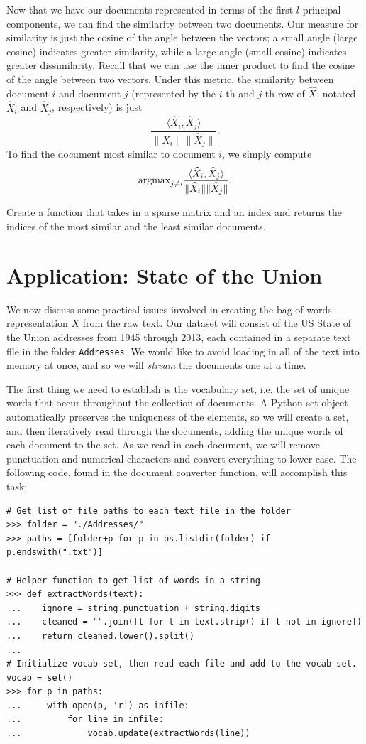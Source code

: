 Now that we have our documents represented in terms of the first $l$ principal components, we can find the similarity between two documents.
Our measure for similarity is just the cosine of the angle between the vectors; a small angle (large cosine) indicates greater similarity, while a large angle (small cosine)
indicates greater dissimilarity.
Recall that we can use the inner product to find the cosine of the angle between two vectors.
Under this metric, the similarity between document $i$ and document $j$ (represented by the $i$-th and $j$-th row of $\widehat{X}$, notated $\widehat{X}_i$ and $\widehat{X}_j$, respectively) is just
\[
\frac{\langle \widehat{X}_i, \widehat{X}_j\rangle}{\|\widehat{X}_i\|\|\widehat{X}_j\|}.
\]
To find the document most similar to document $i$, we simply compute
\[
\mbox{argmax}_{j\neq i} \frac{\langle \widehat{X}_i, \widehat{X}_j\rangle}{\|\widehat{X}_i\|\|\widehat{X}_j\|}.
\]
\begin{problem}
Create a function  that takes in a sparse matrix  and an index  and returns the indices of the most similar and the least similar documents.
\end{problem}
\section*{Application: State of the Union}
We now discuss some practical issues involved in creating the bag of words representation $X$ from the raw text.
Our dataset will consist of the US State of the Union addresses from 1945 through 2013, each contained in a separate text file in the folder {\tt Addresses}.
We would like to avoid loading in all of the text into memory at once, and so we will \emph{stream} the documents one at a time.

The first thing we need to establish is the vocabulary set, i.e. the set of unique words that occur throughout the collection of documents.
A Python set object automatically preserves the uniqueness of the elements, so we will create a set, and then iteratively read through the documents, adding the unique words of each
document to the set. As we read in each document, we will remove punctuation and numerical characters and convert everything to lower case.
The following code, found in the document converter function, will accomplish this task:
\begin{lstlisting}
# Get list of file paths to each text file in the folder
>>> folder = "./Addresses/"
>>> paths = [folder+p for p in os.listdir(folder) if p.endswith(".txt")]

# Helper function to get list of words in a string
>>> def extractWords(text):
...    ignore = string.punctuation + string.digits
...    cleaned = "".join([t for t in text.strip() if t not in ignore])
...    return cleaned.lower().split()
...
# Initialize vocab set, then read each file and add to the vocab set.
vocab = set()
>>> for p in paths:
...     with open(p, 'r') as infile:
...         for line in infile:
...             vocab.update(extractWords(line))
\end{lstlisting}

